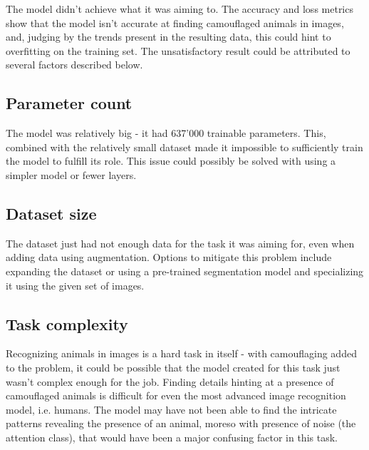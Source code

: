 \documentclass[../main.tex]{subfiles}
\begin{document}
The model didn't achieve what it was aiming to. The accuracy and loss metrics show that the model isn't accurate at finding camouflaged animals in images, and, judging by the trends present in the resulting data, this could hint to overfitting on the training set. The unsatisfactory result could be attributed to several factors described below.

\subsection*{Parameter count}
The model was relatively big - it had 637'000 trainable parameters. This, combined with the relatively small dataset made it impossible to sufficiently train the model to fulfill its role. This issue could possibly be solved with using a simpler model or fewer layers.

\subsection*{Dataset size}
The dataset just had not enough data for the task it was aiming for, even when adding data using augmentation. Options to mitigate this problem include expanding the dataset or using a pre-trained segmentation model and specializing it using the given set of images.

\subsection*{Task complexity}
Recognizing animals in images is a hard task in itself - with camouflaging added to the problem, it could be possible that the model created for this task just wasn't complex enough for the job. Finding details hinting at a presence of camouflaged animals is difficult for even the most advanced image recognition model, i.e. humans. The model may have not been able to find the intricate patterns revealing the presence of an animal, moreso with presence of noise (the attention class), that would have been a major confusing factor in this task.
\end{document}
